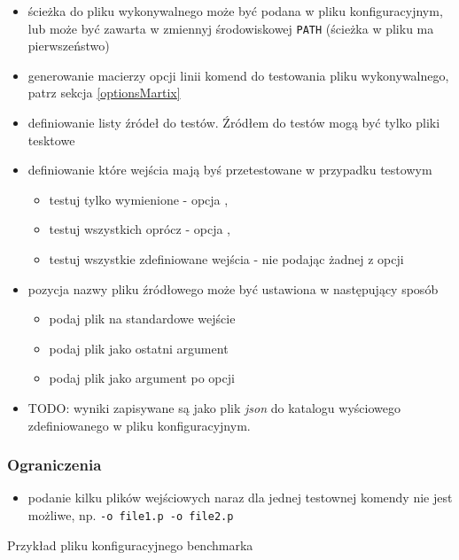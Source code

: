 \documentclass[a4paper,12pt]{article}
\newenvironment{longlisting}{\captionsetup{type=listing}}{}
\begin{document}
\begin{itemize}
  \item ścieżka do pliku wykonywalnego może być podana w pliku konfiguracyjnym, lub może być zawarta w zmiennyj środowiskowej \texttt{PATH} (ścieżka w pliku ma pierwszeństwo)
  \item generowanie macierzy opcji linii komend do testowania pliku wykonywalnego, patrz sekcja \ref{optionsMartix}
  \item definiowanie listy źródeł do testów. Źródłem do testów mogą być tylko pliki tesktowe
  \item definiowanie które wejścia mają byś przetestowane w przypadku testowym
    \begin{itemize}
      \item testuj tylko wymienione - opcja ,
      \item testuj wszystkich oprócz - opcja ,
      \item testuj wszystkie zdefiniowane wejścia - nie podając żadnej z opcji
    \end{itemize}
  \item pozycja nazwy pliku źródłowego może być ustawiona w następujący sposób
    \begin{itemize}
      \item podaj plik na standardowe wejście 
      \item podaj plik jako ostatni argument 
      \item podaj plik jako argument po opcji 
    \end{itemize}
  \item TODO: wyniki zapisywane są jako plik \textit{json} do katalogu wyściowego zdefiniowanego w pliku konfiguracyjnym.
\end{itemize}

\subsubsection{Ograniczenia}

\begin{itemize}
  \item podanie kilku plików wejściowych naraz dla jednej testownej komendy nie jest możliwe, np. \texttt{-o file1.p -o file2.p}
\end{itemize}

\begin{longlisting}
  \caption{Przykład pliku konfiguracyjnego benchmarka}
  \label{configFile}
\end{longlisting}
\end{document}
